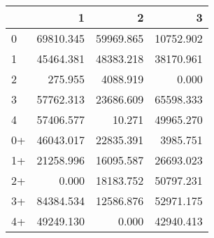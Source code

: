 \begin{tabular}{lrrr}
\toprule
     &         1 &         2 &         3 \\
\midrule
 0   & \num{69810.345} & \num{59969.865} & \num{10752.902} \\
 1   & \num{45464.381} & \num{48383.218} & \num{38170.961} \\
 2   &   \num{275.955} &  \num{4088.919} &     \num{0.000} \\
 3   & \num{57762.313} & \num{23686.609} & \num{65598.333} \\
 4   & \num{57406.577} &    \num{10.271} & \num{49965.270} \\
 0+  & \num{46043.017} & \num{22835.391} &  \num{3985.751} \\
 1+  & \num{21258.996} & \num{16095.587} & \num{26693.023} \\
 2+  &     \num{0.000} & \num{18183.752} & \num{50797.231} \\
 3+  & \num{84384.534} & \num{12586.876} & \num{52971.175} \\
 4+  & \num{49249.130} &     \num{0.000} & \num{42940.413} \\
\bottomrule
\end{tabular}